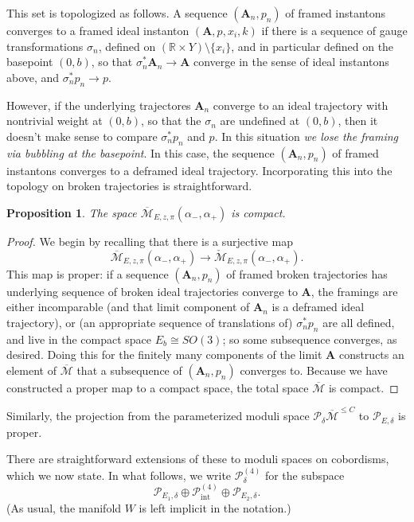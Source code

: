 \documentclass[10pt,a4paper]{amsart}
\newtheorem{proposition}[theorem]{Proposition}
\theoremstyle{definition}
\theoremstyle{remark}
\numberwithin{figure}{qchap}
\begin{document}
This set is topologized as follows. A sequence $(\mathbf{A}_n,p_n)$ of framed instantons converges to a framed ideal instanton $(\mathbf{A},p,x_i,k)$ if there is a sequence of gauge transformations $\sigma_n$, defined on $(\mathbb R \times Y) \setminus \{x_i\}$, and in particular defined on the basepoint $(0,b)$, so that $\sigma_n^*\mathbf{A}_n \to \mathbf{A}$ converge in the sense of ideal instantons above, and $\sigma_n^*p_n \to p$.

However, if the underlying trajectores $\mathbf{A}_n$ converge to an ideal trajectory with nontrivial weight at $(0,b)$, so that the $\sigma_n$ are undefined at $(0,b)$, then it doesn't make sense to compare $\sigma_n^*p_n$ and $p$. In this situation \emph{we lose the framing via bubbling at the basepoint}. In this case, the sequence $(\mathbf{A}_n,p_n)$ of framed instantons converges to a deframed ideal trajectory. Incorporating this into the topology on broken trajectories is straightforward.

\begin{proposition}The space $\overline{\mathcal M}_{E,z,\pi}(\alpha_-, \alpha_+)$ is compact.
\end{proposition}

\begin{proof}We begin by recalling that there is a surjective map $$\overline{\mathcal M}_{E,z,\pi}(\alpha_-, \alpha_+) \to \check{\mathcal M}_{E,z,\pi}(\alpha_-,\alpha_+).$$ This map is proper: if a sequence $(\mathbf{A}_n,p_n)$ of framed broken trajectories has underlying sequence of broken ideal trajectories converge to $\mathbf{A}$, the framings are either incomparable (and that limit component of $\mathbf{A}_n$ is a deframed ideal trajectory), or (an appropriate sequence of translations of) $\sigma_n^*p_n$ are all defined, and live in the compact space $E_b \cong SO(3)$; so some subsequence converges, as desired. Doing this for the finitely many components of the limit $\mathbf{A}$ constructs an element of $\overline{\mathcal M}$ that a subsequence of $(\mathbf{A}_n, p_n)$ converges to.
Because we have constructed a proper map to a compact space, the total space $\overline{\mathcal M}$ is compact.
\end{proof}

Similarly, the projection from the parameterized moduli space $\mathcal P_\delta \overline{\mathcal M}^{\leq C}$ to $\mathcal P_{E, \delta}$ is proper.

There are straightforward extensions of these to moduli spaces on cobordisms, which we now state. In what follows, we write $\mathcal P^{(4)}_\delta$ for the subspace $$\mathcal P_{E_1, \delta} \oplus \mathcal P^{(4)}_{\text{int}} \oplus \mathcal P_{E_2, \delta}.$$  
(As usual, the manifold $W$ is left implicit in the notation.) 
\end{document}

